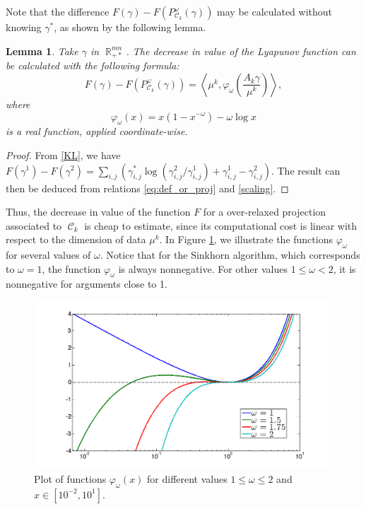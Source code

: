 \documentclass{article} %
\newcommand{\scal}[2]{\left\langle #1 , #2 \right\rangle}
\DeclareMathOperator{\IR}{\mathbb{R}}
\DeclareMathOperator{\Ccal}{\mathcal{C}}
\theoremstyle{plain}
\newtheorem{lemma}{Lemma}
\theoremstyle{definition}
\theoremstyle{remark}
\begin{document}
Note that the difference $F(\gamma) - F(P^\omega_{\Ccal_k}(\gamma))$ may be calculated without knowing $\gamma^*$, as shown by the following lemma.
\begin{lemma}\label{lemma:lyapunov_decrease}
	Take $\gamma$ in $\IR^{mn}_{+*}$. The decrease in value of the Lyapunov function can be calculated with the following formula:
	\begin{equation} \label{eq:kl_diff_scal}
	F(\gamma) - F(P^\omega_{\Ccal_k}(\gamma)) = 
	\scal{\mu^k}{\varphi_\omega \left(\frac{A_k \gamma}{\mu^k}\right)},
	\end{equation}
	where
	\begin{equation}
	\varphi_\omega(x) = x(1-x^{-\omega}) - \omega \log x
	\end{equation}
	is a real function, applied coordinate-wise.
\end{lemma}
\begin{proof}
From \eqref{KL}, we have $F(\gamma^1)-F(\gamma^2)= \sum_{i,j}\left(\gamma^*_{i,j}\log(\gamma^2_{i,j}/\gamma^1_{i,j})+\gamma^1_{i,j}-\gamma^2_{i,j}\right)$. The result can then be deduced from relations \eqref{eq:def_or_proj} and \eqref{scaling}.
\end{proof}
Thus,  the decrease in value of the function $F$ for a over-relaxed projection associated to $\Ccal_k$ is cheap to estimate, since its computational cost is  linear with respect to the dimension of data $\mu^k$. In Figure \ref{phi_omega}, we illustrate the functions  $\varphi_\omega$ for several values of $\omega$.
Notice that for the Sinkhorn algorithm, which corresponds to $\omega=1$, the function $\varphi_\omega$ is always nonnegative. For other values $1\le\omega<2$, it is nonnegative for arguments close to 1.
\begin{figure}[ht!]
\begin{center}
\includegraphics[width=11cm]{phi_omega.png}
\caption{\label{phi_omega} Plot of functions $\varphi_\omega(x)$ for different values $1\leq \omega\leq 2$ and   $x\in[10^{-2}, 10^1]$.}
\end{center}
\end{figure}
\end{document}
